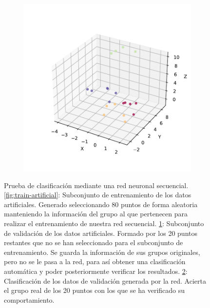 \begin{figure}[p]
\begin{subfigure}{0.45\textwidth}
    \caption{}
    \label{fig:test-artificial}
  \end{subfigure}
  \begin{subfigure}{0.45\textwidth}
    \centering
    \includegraphics[width=\textwidth]{figures/test-asig-artificial.pdf}
    \caption{}
    \label{fig:net-class-artificial}
  \end{subfigure}
  \caption[Prueba de red neuronal secuencial.]{Prueba de clasificación mediante una red neuronal secuencial. \ref{fig:train-artificial}: Subconjunto de entrenamiento de los datos artificiales. Generado seleccionando 80 puntos de forma aleatoria manteniendo la información del grupo al que pertenecen para realizar el entrenamiento de nuestra red secuencial. \ref{fig:test-artificial}: Subconjunto de validación de los datos artificiales. Formado por los 20 puntos restantes que no se han seleccionado para el subconjunto de entrenamiento. Se guarda la información de sus grupos originales, pero no se le pasa a la red, para así obtener una clasificación automática y poder posteriormente verificar los resultados. \ref{fig:net-class-artificial}: Clasificación de los datos de validación generada por la red. Acierta el grupo real de los 20 puntos con los que se ha verificado su comportamiento.}
  \label{fig:net-artificial}
\end{figure}

